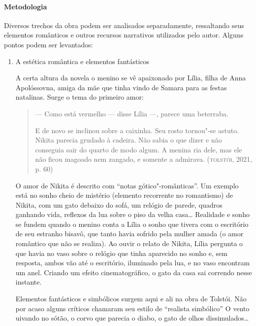 \documentclass{article}
\begin{document}
\paragraph{Metodologia}
Diversos trechos da obra podem ser analisados separadamente, ressaltando
seus elementos românticos e outros recursos narrativos utilizados pelo
autor. Alguns pontos podem ser levantados:

\begin{enumerate}
\item
A estética romântica e elementos fantásticos

A certa altura da novela o menino se vê apaixonado por Lília, filha de
Anna Apolóssovna, amiga da mãe que tinha vindo de Samara para as festas
natalinas. Surge o tema do primeiro amor:

\begin{quote}
--- Como está vermelho --- disse Lília ---, parece uma beterraba.

E de novo se inclinou sobre a caixinha. Seu rosto tornou"-se astuto.
Nikita parecia grudado à cadeira. Não sabia o que dizer e não conseguia
sair do quarto de modo algum. A menina ria dele, mas ele não ficou
magoado nem zangado, e somente a admirava. (\textsc{tolstói}, 2021, p. 60)
\end{quote}

O amor de Nikita é descrito com ``notas gótico"-românticas''. Um
exemplo está no sonho cheio de mistério (elemento recorrente no
romantismo) de Nikita, com um gato debaixo do sofá, um relógio de
parede, quadros ganhando vida, reflexos da lua sobre o piso da velha
casa\ldots{} Realidade e sonho se fundem quando o menino conta a Lília o
sonho que tivera com o escritório de seu estranho bisavô, que tanto
havia sofrido pela mulher amada (o amor romântico que não se realiza).
Ao ouvir o relato de Nikita, Lília pergunta o que havia no vaso sobre o
relógio que tinha aparecido no sonho e, sem resposta, ambos vão até o
escritório, iluminado pela lua, e no vaso encontram um anel. Criando um
efeito cinematográfico, o gato da casa sai correndo nesse instante.

Elementos fantásticos e simbólicos surgem aqui e ali na obra de
Tolstói. Não por acaso alguns críticos chamaram seu estilo de ``realista
simbólico'' O vento uivando no sótão, o corvo que parecia o diabo, o
gato de olhos dissimulados\ldots{}



\end{enumerate}
\end{document}
